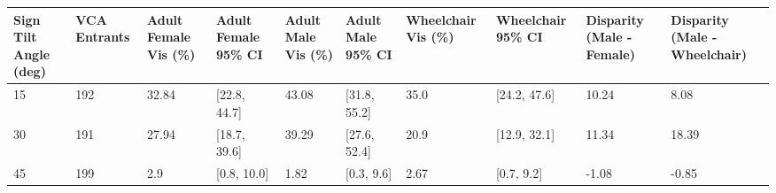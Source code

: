 \begin{tabular}{llllllllll}
\hline
Sign Tilt Angle (deg) & VCA Entrants & Adult Female Vis (\%) & Adult Female 95\% CI & Adult Male Vis (\%) & Adult Male 95\% CI & Wheelchair Vis (\%) & Wheelchair 95\% CI & Disparity (Male - Female) & Disparity (Male - Wheelchair) \\ \hline
15 & 192 & 32.84 & [22.8, 44.7] & 43.08 & [31.8, 55.2] & 35.0 & [24.2, 47.6] & 10.24 & 8.08 \\
30 & 191 & 27.94 & [18.7, 39.6] & 39.29 & [27.6, 52.4] & 20.9 & [12.9, 32.1] & 11.34 & 18.39 \\
45 & 199 & 2.9 & [0.8, 10.0] & 1.82 & [0.3, 9.6] & 2.67 & [0.7, 9.2] & -1.08 & -0.85 \\
\hline
\end{tabular}
